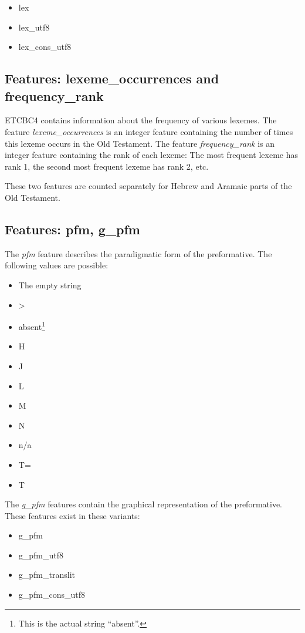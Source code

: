 \documentclass[11pt,oneside,a4paper]{memoir}
\begin{document}
\begin{itemize}
\item lex
\item lex\_utf8
\item lex\_cons\_utf8
\end{itemize}

\subsection{Features: lexeme\_occurrences and frequency\_rank}

ETCBC4 contains information about the frequency of various lexemes. The feature
\emph{lexeme\_occurrences} is an integer feature containing the number of times this lexeme
occurs in the Old Testament. The feature \emph{frequency\_rank} is an integer feature containing the
rank of each lexeme: The most frequent lexeme has rank 1, the second most frequent lexeme has rank
2, etc.

These two features are counted separately for Hebrew and Aramaic parts of the Old Testament. 


\subsection{Features: pfm, g\_pfm}

The \emph{pfm} feature describes the paradigmatic form of the preformative. The following values are
possible:

\begin{itemize}
\item The empty string
\item >
\item absent\footnote{This is the actual string ``absent''.}
\item H
\item J
\item L
\item M
\item N
\item n/a
\item T=
\item T
\end{itemize}

The \emph{g\_pfm} features contain the graphical representation of the preformative. These
features exist in these variants:

\begin{itemize}
\item g\_pfm
\item g\_pfm\_utf8
\item g\_pfm\_translit
\item g\_pfm\_cons\_utf8
\end{itemize}
\end{document}
